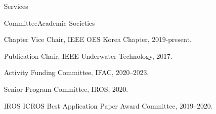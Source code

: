 \begin{rSection}{Services}

\begin{rSubsection}{Committee}{}{Academic Societies}{}


  \item Chapter Vice Chair, IEEE OES Korea Chapter, 2019-present.


  \item Publication Chair, IEEE Underwater Technology, 2017.

  \item Activity Funding Committee, IFAC, 2020--2023.
  \item Senior Program Committee, IROS, 2020.
  \item IROS ICROS Best Application Paper Award Committee, 2019--2020.
\end{rSubsection}


%
%


\end{rSection}

